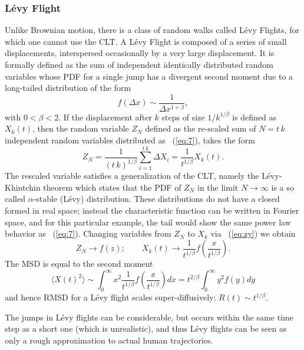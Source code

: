 \subsubsection{L\'evy Flight}
\label{sec:levy}

Unlike Brownian motion, there is a class of random walks called L\'evy Flights, for which one cannot use the CLT. A L\'evy Flight is composed of a series of small displacements, interspersed occasionally by a very large displacement. It is formally defined as the sum of independent identically distributed random variables whose PDF for a single jump has a divergent second moment due to a long-tailed distribution of the form
\begin{equation}
f(\Delta x) \sim \frac{1}{\Delta x^{1+\beta}}, \label{eq:7}
\end{equation} 
with $0 < \beta < 2$. 
If the displacement after $k$ steps of size $1 / k^{1/\beta}$ is defined as $X_k(t)$, then the random variable $Z_N$ defined as the re-scaled sum of $N = t\, k$ independent random variables distributed as \equationname~(\ref{eq:7}), takes the form
\begin{equation} \label{eq:zy}
Z_N = \frac{1}{(t \, k)^{1/\beta}}\sum_{i=1}^{t\, k}\Delta X_i = \frac{1}{t^{1/\beta}}X_k(t).
\end{equation}
The rescaled variable satisfies a generalization of the CLT, namely the L\'evy-Khintchin theorem which states that the PDF of $Z_N$ in the limit $N \to \infty$ is a so called $\alpha$-stable (L\'evy) distribution. These distributions do not have a closed formed in real space; instead the characteristic function can be written in Fourier space, and for this particular example, the tail would show the same power law behavior as \equationname~(\ref{eq:7}). Changing variables from $Z_N$ to $X_k$ via \equationname~(\ref{eq:zy}) we obtain
\begin{equation}
Z_N \to f(z); \qquad
X_k(t) \to \frac{1}{t^{1/\beta}}f\left(\frac{x}{t^{1/\beta}}\right). 
\end{equation}
The MSD is equal to the second moment
\begin{equation}
\langle X(t)^2 \rangle \sim \int_{0}^{\infty} x^2 \frac{1}{t^{1/\beta}}f\left(\frac{x}{t^{1/\beta}}\right) d x = t^{2/\beta} \int_{0}^{\infty} y^2 f\left(y\right) d y
\label{levy:MSD}
\end{equation}
and hence RMSD for a L\'evy flight scales super-diffusively: $R(t) \sim t^{1/\beta}$.

The jumps in L\'evy flights can be considerable, but occurs within the same time step as a short one (which is unrealistic), and thus L\'evy flights can be seen as only a rough approximation to actual human trajectories.

